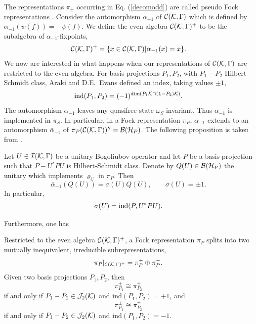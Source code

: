 \documentclass[10pt,a4paper]{article}
\begin{document}
The representations $\pi_\pm$ occurring in Eq.
(\ref{decomodd}) are called pseudo Fock
representations \cite{Ara1}.
Consider the automorphism $\alpha_{-1}$ of
${\cal C}({\cal K},\Gamma)$ which is defined by
$\alpha_{-1}(\psi(f))=-\psi(f)$. We define the
even algebra ${\cal C}({\cal K},\Gamma)^+$
to be the subalgebra of $\alpha_{-1}$-fixpoints,
\begin{equation}
{\cal C}({\cal K},\Gamma)^+ = \{ x \in
{\cal C}({\cal K},\Gamma) | \alpha_{-1}(x)=x \}.
\end{equation}
We now are interested in what happens when our
representations of ${\cal C}({\cal K},\Gamma)$
are restricted to the even algebra. For basis
projections $P_1,P_2$, with $P_1-P_2$ Hilbert Schmidt
class, Araki and D.E.~Evans \cite{AE} defined
an index, taking values $\pm 1$,
\[ \mbox{ind}(P_1,P_2)= (-1)^{{\rm dim}(
P_1{\cal K}\cap({\bf 1}-P_2){\cal K})}. \]
The automorphism $\alpha_{-1}$ leaves any
quasifree state $\omega_S$ invariant. Thus
$\alpha_{-1}$ is implemented in $\pi_S$. In particular,
in a Fock representation $\pi_P$, $\alpha_{-1}$
extends to an automorphism $\bar{\alpha}_{-1}$ of
$\pi_P({\cal C}({\cal K},\Gamma))''=
{\cal B}({\cal H}_P)$. The following proposition
is taken from \cite{Ara2}.
\begin{proposition}
\label{ind}
Let $U\in{\cal I}({\cal K},\Gamma)$ be a unitary
Bogoliubov operator and let $P$ be a basis
projection such that $P-U^*PU$ is Hilbert-Schmidt
class. Denote by $Q(U)\in{\cal B}({\cal H}_P)$ the
unitary which implements $\varrho_U$ in $\pi_P$. Then
\begin{equation}
\bar{\alpha}_{-1}(Q(U)) = \sigma(U) Q(U),\qquad
\sigma(U)=\pm 1.
\end{equation}
In particular,
\begin{equation}
\sigma(U) = \mbox{\rm ind}(P,U^*PU).
\end{equation}
\end{proposition}
Furthermore, one has \cite{AE,Ara2}
\begin{theorem}
\label{resteven}
Restricted to the even algebra
${\cal C}({\cal K},\Gamma)^+$, a Fock representation
$\pi_P$ splits into two mutually inequivalent, irreducible
subrepresentations,
\begin{equation}
\pi_P|_{{\cal C}({\cal K},\Gamma)^+}=\pi_P^+\oplus
\pi_P^-.
\end{equation}
Given two basis projections $P_1,P_2$, then
\begin{equation}
\pi_{P_1}^\pm \cong \pi_{P_2}^\pm
\end{equation}
if and only if $P_1-P_2\in{\cal J}_2({\cal K})$ and
{\rm ind}$(P_1,P_2)=+1$, and
\begin{equation}
\pi_{P_1}^\pm \cong \pi_{P_2}^\mp
\end{equation}
if and only if $P_1-P_2\in{\cal J}_2({\cal K})$ and
{\rm ind}$(P_1,P_2)=-1$.
\end{theorem}
\end{document}
